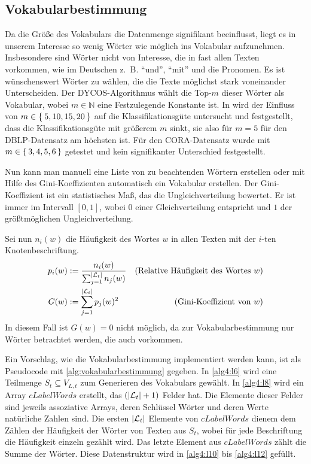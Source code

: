 \subsection{Vokabularbestimmung}\label{sec:vokabularbestimmung}
Da die Größe des Vokabulars die Datenmenge signifikant beeinflusst,
liegt es in unserem Interesse so wenig Wörter wie möglich ins
Vokabular aufzunehmen. Insbesondere sind Wörter nicht von Interesse,
die in fast allen Texten vorkommen, wie im Deutschen z.~B.
\enquote{und}, \enquote{mit} und die Pronomen. Es ist wünschenswert
Wörter zu wählen, die die Texte möglichst stark voneinander Unterscheiden.
Der DYCOS-Algorithmus wählt die Top-$m$ dieser Wörter als Vokabular,
wobei $m \in \mathbb{N}$ eine Festzulegende Konstante ist. In \cite[S. 365]{aggarwal2011}
wird der Einfluss von $m \in \Set{5,10, 15,20}$ auf die Klassifikationsgüte
untersucht und festgestellt, dass die Klassifikationsgüte mit größerem
$m$ sinkt, sie also für $m=5$ für den DBLP-Datensatz am höchsten ist.
Für den CORA-Datensatz wurde mit $m \in \set{3,4,5,6}$ getestet und 
kein signifikanter Unterschied festgestellt.

Nun kann man manuell eine Liste von zu beachtenden Wörtern erstellen
oder mit Hilfe des Gini-Koeffizienten automatisch ein Vokabular erstellen.
Der Gini-Koeffizient ist ein statistisches Maß, das die Ungleichverteilung
bewertet. Er ist immer im Intervall $[0,1]$, wobei $0$ einer 
Gleichverteilung entspricht und $1$ der größtmöglichen Ungleichverteilung.

Sei nun $n_i(w)$ die Häufigkeit des Wortes $w$ in allen Texten mit 
der $i$-ten Knotenbeschriftung.
\begin{align}
    p_i(w) &:= \frac{n_i(w)}{\sum_{j=1}^{|\mathcal{L}_t|} n_j(w)} &\text{(Relative Häufigkeit des Wortes $w$)}\\
    G(w)   &:= \sum_{j=1}^{|\mathcal{L}_t|} p_j(w)^2              &\text{(Gini-Koeffizient von $w$)}
\end{align}
In diesem Fall ist $G(w)=0$ nicht möglich, da zur Vokabularbestimmung
nur Wörter betrachtet werden, die auch vorkommen.

Ein Vorschlag, wie die Vokabularbestimmung implementiert werden kann,
ist als Pseudocode mit \cref{alg:vokabularbestimmung}
gegeben. In \cref{alg4:l6} wird eine Teilmenge $S_t \subseteq V_{L,t}$
zum Generieren des Vokabulars gewählt. In \cref{alg4:l8} wird ein Array $cLabelWords$ erstellt, das $(|\mathcal{L}_t|+1)$ Felder hat.
Die Elemente dieser Felder sind jeweils assoziative Arrays, deren
Schlüssel Wörter und deren Werte natürliche Zahlen sind. Die ersten 
$|\mathcal{L}_t|$ Elemente von $cLabelWords$ dienem dem Zählen der Häufigkeit
der Wörter von Texten aus $S_t$, wobei für jede Beschriftung die
Häufigkeit einzeln gezählt wird. Das letzte Element aus $cLabelWords$
zählt die Summe der Wörter. Diese Datenstruktur wird in
\cref{alg4:l10} bis \ref{alg4:l12} gefüllt. 

